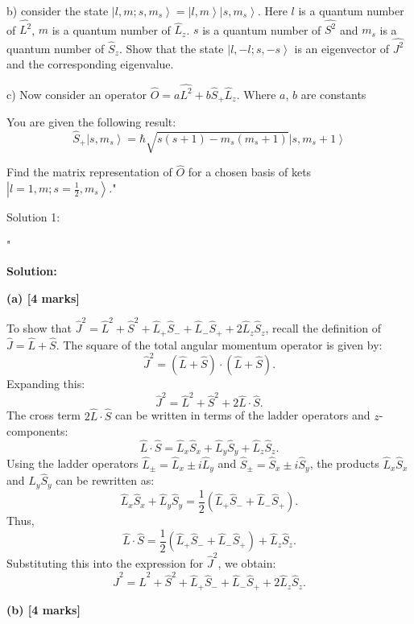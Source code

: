 b) consider the state \( \left|l, m; s, m_{s} \right> = \left|l, m \right>\left|s, m_{s} \right> \). Here \( l \) is a quantum number of \( \hat{L^{2}} \), \( m \) is a quantum number of \( \hat{L}_{z} \). \( s \) is a quantum number of \( \hat{S^{2}} \) and \( m_{s} \) is a quantum number of \( \hat{S}_{z} \). Show that the state \( \left|l, -l; s, -s \right> \) is an eigenvector of \( \hat{J^{2}} \) and the corresponding eigenvalue. 

c) Now consider an operator \( \hat{O} = a\hat{L^{2}} + b\hat{S}_{+}\hat{L}_{z} \). Where \( a \), \( b \) are constants

You are given the following result:
\[ \hat{S}_{+} \left|s, m_{s} \right> = \hbar \sqrt{s(s+1) - m_{s}(m_{s}+1)} \left|s, m_{s}+1 \right> \]

Find the matrix representation of \( \hat{O} \) for a chosen basis of kets \( \left|l=1, m; s=\frac{1}{2}, m_{s} \right> \)."

Solution 1: 

"

\textbf{Solution:}  

\textbf{(a) [4 marks]}  

To show that $\hat{J}^2 = \hat{L}^2 + \hat{S}^2 + \hat{L}_+ \hat{S}_- + \hat{L}_- \hat{S}_+ + 2 \hat{L}_z \hat{S}_z$, recall the definition of $\hat{J} = \hat{L} + \hat{S}$. The square of the total angular momentum operator is given by:  
\[
\hat{J}^2 = (\hat{L} + \hat{S}) \cdot (\hat{L} + \hat{S}).
\]  
Expanding this:  
\[
\hat{J}^2 = \hat{L}^2 + \hat{S}^2 + 2 \hat{L} \cdot \hat{S}.
\]  
The cross term $2 \hat{L} \cdot \hat{S}$ can be written in terms of the ladder operators and $z$-components:  
\[
\hat{L} \cdot \hat{S} = \hat{L}_x \hat{S}_x + \hat{L}_y \hat{S}_y + \hat{L}_z \hat{S}_z.
\]  
Using the ladder operators $\hat{L}_\pm = \hat{L}_x \pm i \hat{L}_y$ and $\hat{S}_\pm = \hat{S}_x \pm i \hat{S}_y$, the products $\hat{L}_x \hat{S}_x$ and $\hat{L}_y \hat{S}_y$ can be rewritten as:  
\[
\hat{L}_x \hat{S}_x + \hat{L}_y \hat{S}_y = \frac{1}{2} \left( \hat{L}_+ \hat{S}_- + \hat{L}_- \hat{S}_+ \right).
\]  
Thus,  
\[
\hat{L} \cdot \hat{S} = \frac{1}{2} \left( \hat{L}_+ \hat{S}_- + \hat{L}_- \hat{S}_+ \right) + \hat{L}_z \hat{S}_z.
\]  
Substituting this into the expression for $\hat{J}^2$, we obtain:  
\[
\hat{J}^2 = \hat{L}^2 + \hat{S}^2 + \hat{L}_+ \hat{S}_- + \hat{L}_- \hat{S}_+ + 2 \hat{L}_z \hat{S}_z.
\]  

\textbf{(b) [4 marks]}  

